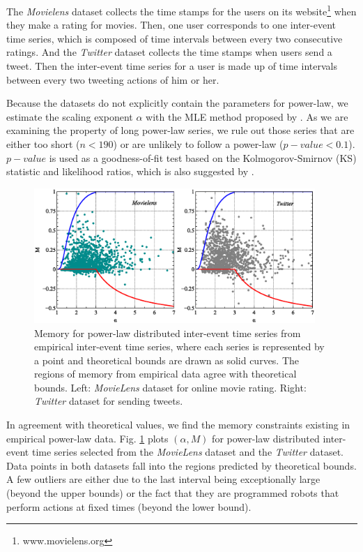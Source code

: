The \textit{Movielens} dataset collects the time stamps for the users on its website\footnote{www.movielens.org} when they make a rating for movies. Then, one user corresponds to one inter-event time series, which is composed of time intervals between every two consecutive ratings. And the \textit{Twitter} dataset collects the time stamps when users send a tweet. Then the inter-event time series for a user is made up of time intervals between every two tweeting actions of him or her.

Because the datasets do not explicitly contain the parameters for power-law, we estimate the scaling exponent $ \alpha $ with the MLE method proposed by \cite{Clauset2009}. As we are examining the property of long power-law series, we rule out those series that are either too short ($ n<190 $)  or are unlikely to follow a power-law ($ p-value<0.1 $). $ p-value $ is used as a goodness-of-fit test based on the Kolmogorov-Smirnov (KS) statistic and likelihood ratios, which is also suggested by \cite{Clauset2009}.


\begin{figure}[!h]
\begin{center}
\includegraphics[width=0.95\textwidth]{figures/ch3_empirical_mem.eps}
\caption{Memory for power-law distributed inter-event time series from empirical inter-event time series, where each series is represented by a point and theoretical bounds are drawn as solid curves. The regions of memory from empirical data agree with theoretical bounds. Left: \textit{MovieLens} dataset for online movie rating. Right: \textit{Twitter} dataset for sending tweets. }
\label{fig:movlens}
\end{center}
\end{figure}
In agreement with theoretical values, we find the memory constraints existing in empirical power-law data. Fig. \ref{fig:movlens} plots $(\alpha, M)$ for power-law distributed inter-event time series selected from the \textit{MovieLens} dataset and the \textit{Twitter} dataset. Data points in both datasets fall into the regions predicted by theoretical bounds. A few outliers are either due to the last interval being exceptionally large (beyond the upper bounds) or the fact that they are programmed robots that perform actions at fixed times (beyond the lower bound).






